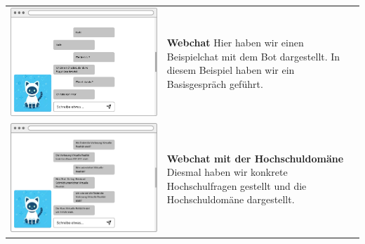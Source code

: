 \begin{tabular}{C{6cm}  L{7cm}}
    \includegraphics[width=\linewidth]{bilder/new vers. UI Design/WebChat/WebChat.png}                      & \textbf{Webchat} \newline
    Hier haben wir einen Beispielchat mit dem Bot dargestellt. In diesem Beispiel haben wir ein
    Basisgespräch geführt.                                                                                                                                      \\
    \includegraphics[width=\linewidth]{bilder/new vers. UI Design/WebChat/WebChat Hochschule.png}           & \textbf{Webchat mit der Hochschuldomäne} \newline
    Diesmal haben wir konkrete Hochschulfragen gestellt und die Hochschuldomäne dargestellt.                                                                    \\

\end{tabular}
